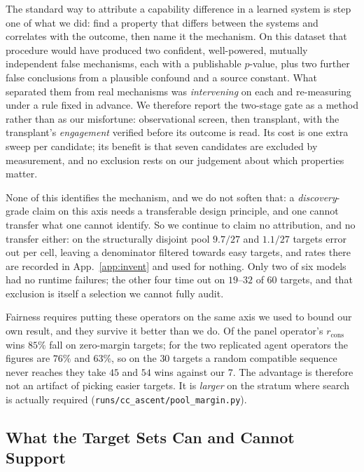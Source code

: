 \documentclass[11pt]{article}
\begin{document}
The standard way to attribute a capability difference in a learned system is step one of what we did: find a
property that differs between the systems and correlates with the outcome, then name it the mechanism. On this
dataset that procedure would have produced two confident, well-powered, mutually independent false mechanisms,
each with a publishable $p$-value, plus two further false conclusions from a plausible confound and a source
constant. What separated them from real mechanisms was \emph{intervening} on each and re-measuring under a rule
fixed in advance. We therefore report the two-stage gate as a method rather than as our misfortune:
observational screen, then transplant, with the transplant's \emph{engagement} verified before its outcome is
read. Its cost is one extra sweep per candidate; its benefit is that seven candidates are excluded by
measurement, and no exclusion rests on our judgement about which properties matter.

None of this identifies the mechanism, and we do not soften that: a \emph{discovery}-grade claim on this axis
needs a transferable design principle, and one cannot transfer what one cannot identify. So we continue to
claim no attribution, and no transfer either: on the structurally
disjoint pool $9.7/27$ and $1.1/27$ targets error out per cell, leaving a denominator filtered towards easy
targets, and rates there are recorded in App.~\ref{app:invent} and used for nothing. Only two of six models
had no runtime failures; the other four time out on $19$--$32$ of $60$ targets, and that exclusion is itself a
selection we cannot fully audit.

Fairness requires putting these operators on the same axis we used to bound our own result, and they survive it
better than we do. Of the panel operator's $r_{\mathrm{cons}}$ wins $85\%$ fall on zero-margin targets; for the
two replicated agent operators the figures are $76\%$ and $63\%$, so on the $30$ targets a random compatible
sequence never reaches they take $45$ and $54$ wins against our $7$. The advantage is therefore not an artifact
of picking easier targets. It is \emph{larger} on the stratum where search is actually required
(\texttt{runs/cc\_ascent/pool\_margin.py}).

\subsection{What the Target Sets Can and Cannot Support}\label{sec:exp:pools}
\end{document}
